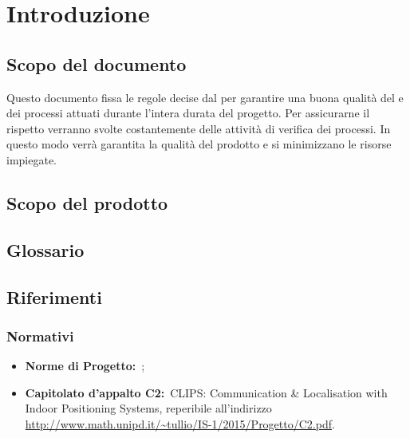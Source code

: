 
\section{Introduzione}
	\subsection{Scopo del documento}
	Questo documento fissa le regole decise dal  per garantire una buona qualità del  e dei processi attuati durante l'intera durata del progetto. Per assicurarne il rispetto verranno svolte costantemente delle attività di verifica dei processi. In questo modo verrà garantita la qualità del prodotto e si minimizzano le risorse impiegate.
	
	\subsection{Scopo del prodotto}
	\SCOPO
	
	\subsection{Glossario}
	\GLOSSARIO
	
	\subsection{Riferimenti} 
	\subsubsection{Normativi}
	\begin{itemize}
		\item \textbf{Norme di Progetto:}\ \NPdoc;
		\item \textbf{Capitolato d'appalto C2:}\ CLIPS: Communication \& Localisation with Indoor Positioning Systems, reperibile all'indirizzo \url{http://www.math.unipd.it/~tullio/IS-1/2015/Progetto/C2.pdf}.
	\end{itemize}
	
